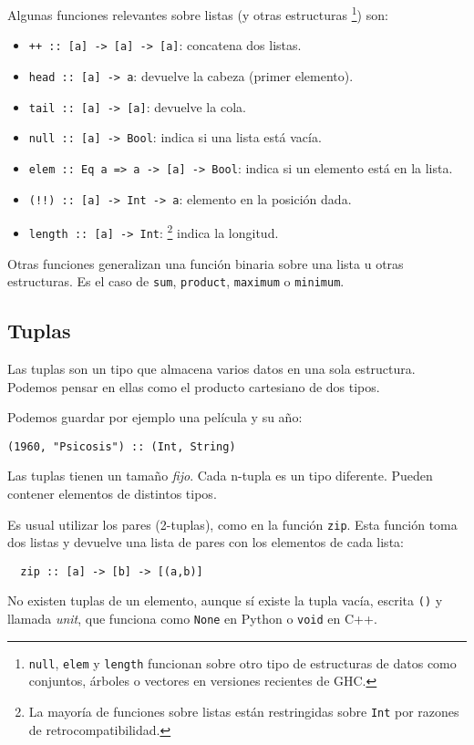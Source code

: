 Algunas funciones relevantes sobre listas (y otras estructuras \footnote{\texttt{null}, \texttt{elem} y \texttt{length} funcionan sobre otro tipo de estructuras de datos como conjuntos, árboles o vectores en versiones recientes de GHC.}) son:

\begin{itemize}
  \item \texttt{++ :: [a] -> [a] -> [a]}: concatena dos listas.
  \item \texttt{head :: [a] -> a}: devuelve la cabeza (primer elemento).
  \item \texttt{tail :: [a] -> [a]}: devuelve la cola.
  \item \texttt{null :: [a] -> Bool}: indica si una lista está vacía.
  \item \texttt{elem :: Eq a => a -> [a] -> Bool}: indica si un elemento está en la lista.
  \item \texttt{(!!) :: [a] -> Int -> a}: elemento en la posición dada.
  \item \texttt{length :: [a] -> Int}:
  \footnote{La mayoría de funciones sobre listas están restringidas sobre \texttt{Int}
  por razones de retrocompatibilidad.} indica la longitud.
\end{itemize}

Otras funciones generalizan una función binaria sobre una lista u otras estructuras. Es el caso de
\texttt{sum}, \texttt{product}, \texttt{maximum} o \texttt{minimum}.

\subsection{Tuplas}
Las tuplas son un tipo que almacena varios datos en una sola estructura.
Podemos pensar en ellas como el producto cartesiano de dos tipos.

Podemos guardar por ejemplo una película y su año:

\begin{lstlisting}
(1960, "Psicosis") :: (Int, String)
\end{lstlisting}

Las tuplas tienen un tamaño \textit{fijo}. Cada n-tupla es un tipo diferente.
Pueden contener elementos de distintos tipos.

Es usual utilizar los pares (2-tuplas), como en la función \texttt{zip}.
Esta función toma dos listas y devuelve una lista de pares con los elementos de
cada lista:

\begin{lstlisting}
  zip :: [a] -> [b] -> [(a,b)]
\end{lstlisting}

No existen tuplas de un elemento, aunque sí existe la tupla vacía, escrita \texttt{()}
y llamada \textit{unit}, que funciona como \texttt{None} en Python o \texttt{void} en C++.
